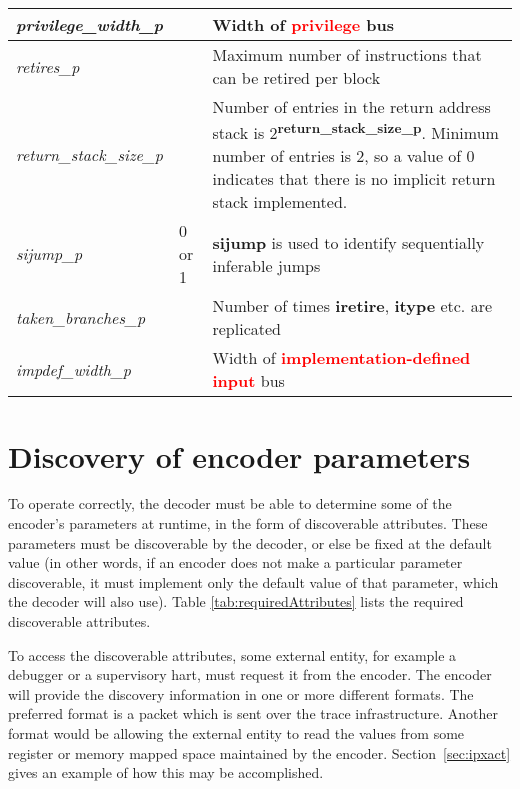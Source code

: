 \begin{table}[h]
\begin{tabulary}{\textwidth}{|l|l|p{100mm}|}
        \hline
        \textit{privilege\_width\_p} & & Width of \textcolor{red}{\textbf{privilege}} bus \\
        \hline
        \textit{retires\_p} &  & Maximum number of instructions that can be retired per block \\
        \hline
        \textit{return\_stack\_size\_p} &  & Number of entries in the return address stack is 2\textsuperscript{\textbf{return\_stack\_size\_p}}.
                                    Minimum number of entries is 2, so a value of 0 indicates that there is no implicit return stack implemented.\\
        \hline
        \textit{sijump\_p} & 0 or 1 & \textbf{sijump} is used to identify sequentially inferable jumps\\
        \hline
        \textit{taken\_branches\_p} & & Number of times \textbf{iretire}, \textbf{itype} etc. are replicated\\
        \hline
        \textit{impdef\_width\_p} & & Width of \textcolor{red}{\textbf{implementation-defined input}} bus \\
        \hline
    \end{tabulary}
\end{table}
\FloatBarrier

\section {Discovery of encoder parameters} \label{sec:disco}

To operate correctly, the decoder must be able to determine some of the encoder's parameters 
at runtime, in the form of discoverable attributes.  These parameters must be discoverable by the 
decoder, or else be fixed at the default value (in other words, if an encoder does not make a 
particular parameter discoverable, it must implement only the default value of that parameter, 
which the decoder will also use).  Table \ref{tab:requiredAttributes} lists the required 
discoverable attributes.

To access the discoverable attributes, some external entity, for example a debugger or a 
supervisory hart, must request it from the encoder. The encoder will
provide the discovery information in one or more different formats.  
The preferred format is a packet which is sent over the trace infrastructure.
Another format would be allowing the external entity to read the
values from some register or memory mapped space maintained by the encoder.
Section~\ref{sec:ipxact} gives an example of how this may be accomplished.

